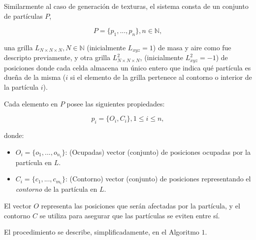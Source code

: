Similarmente al caso de generación de texturas, el sistema consta de un conjunto de part\'iculas $P$,

\begin{equation}
  P = \{p_{1}, ... , p_{n}\}, n  \in \mathbb{N},
\end{equation}

\noindent una grilla $L_{N\times N \times N}, N \in \mathbb{N} $ (inicialmente $L_{xyz}=1$) de masa y aire como fue descripto previamente, y otra grilla $L^{2}_{N\times N \times N}$, (inicialmente $L^{2}_{xyz}=-1$) de posiciones donde cada celda almacena un único entero que indica qu\'e part\'icula es due\~na de la misma ($i$ si el elemento de la grilla pertenece al contorno o interior de la part\'icula $i$).

Cada elemento en $P$ posee las siguientes propiedades:

\begin{equation}
  p_{i} = \{O_{i}, C_{i}\}, 1 \le i \le n,
\end{equation}

\noindent donde:

\begin{itemize}
\item $O_{i} = \{o_{1}, ... , o_{n_{i}}\}$: (Ocupadas) vector (conjunto) de posiciones ocupadas por la part\'icula en $L$.

\item $C_{i} = \{c_{1}, ... , c_{m_{i}}\}$: (Contorno) vector (conjunto) de posiciones representando el {\em contorno} de la part\'icula en $L$.
\end{itemize}

El vector $O$ representa las posiciones que ser\'an afectadas por la part\'icula, y el contorno $C$ se utiliza para asegurar que las part\'iculas se eviten entre s\'i.

El procedimiento se describe, simplificadamente, en el Algoritmo $1$. 

